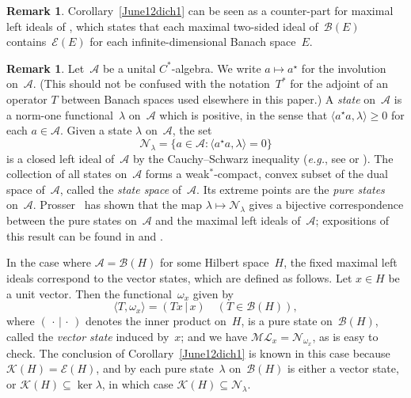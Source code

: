 \documentclass[12pt]{amsart}
\theoremstyle{definition}
\newtheorem{remark}[theorem]{Remark}
\numberwithin{equation}{section}
\begin{document}
\begin{remark}\label{inessin2sidedmaxideals}
  Corollary~\ref{June12dich1} can be seen as a counter-part for
  maximal left ideals of \cite[Proposition~6.6]{lau1}, which states
  that each maximal two-sided ideal of~$\mathscr{B}(E)$
  contains~$\mathscr{E}(E)$ for each
  infinite-di\-men\-sional Banach space~$E$.
\end{remark}

\begin{remark}
  Let~$\mathscr{A}$ be a unital $C^*$-algebra. We write $a\mapsto
  a^\star$ for the involution on~$\mathscr{A}$. (This should not be
  confused with the notation~$T^*$ for the adjoint of an operator $T$
  between Banach spaces used elsewhere in this paper.)  A \emph{state}
  on~$\mathscr{A}$ is a norm-one functional~$\lambda$ on~$\mathscr{A}$
  which is positive, in the sense that $\langle a^\star
  a,\lambda\rangle{\ensuremath{\geqslant}} 0$ for each $a\in\mathscr{A}$.  Given a state
  $\lambda$ on~$\mathscr{A}$, the set
  \begin{equation*}
    \mathscr{N}_\lambda = \bigl\{ a\in\mathscr{A} : \langle a^\star
    a,\lambda\rangle = 0\bigr\} \end{equation*} is a closed left ideal
  of~$\mathscr{A}$ by the Cauchy--Schwarz inequality (\emph{e.g.}, see
  \cite[Propo\-si\-tion~4.5.1]{kr1} or \cite[p.~93]{murphy}). The
  collection of all states on~$\mathscr{A}$ forms a weak$^*$-compact,
  convex subset of the dual space of~$\mathscr{A}$, called the
  \emph{state space} of~$\mathscr{A}$. Its extreme points are the
  \emph{pure states}
  on~$\mathscr{A}$. Prosser~\cite[Theorem~6.2]{prosser} has shown that
  the map $\lambda\mapsto\mathscr{N}_\lambda$ gives a bijective
  correspondence between the pure states on~$\mathscr{A}$ and the
  maximal left ideals of~$\mathscr{A}$; expositions of this result can
  be found in \cite[Theorem~10.2.10]{kr2} and
  \cite[Theorem~5.3.5]{murphy}.

  In the case where $\mathscr{A} = \mathscr{B}(H)$ for some Hilbert
  space~$H$, the fixed maximal left ideals correspond to the vector
  states, which are defined as follows.  Let $x\in H$ be a unit
  vector. Then the functional~$\omega_x$ given by
  \[ \langle T,\omega_x\rangle = (Tx\,|\,x)\quad
  (T\in\mathscr{B}(H)), \] where $(\,\cdot\, |\,\cdot\,)$ denotes the
  inner product on~$H$, is a pure state on~$\mathscr{B}(H)$, called
  the \emph{vector state} induced by~$x$; and we have
  $\mathscr{M}\!\mathscr{L}_x = \mathscr{N}_{\omega_x}$, as is easy to
  check. The conclusion of Corollary~\ref{June12dich1} is known in
  this case because $\mathscr{K}(H) = \mathscr{E}(H)$, and by
  \cite[Corollary~10.4.4]{kr2} each pure state~$\lambda$
  on~$\mathscr{B}(H)$ is either a vector state, or
  $\mathscr{K}(H)\subseteq\ker\lambda$, in which case
  $\mathscr{K}(H)\subseteq\mathscr{N}_\lambda$.


\end{remark}
\end{document}
